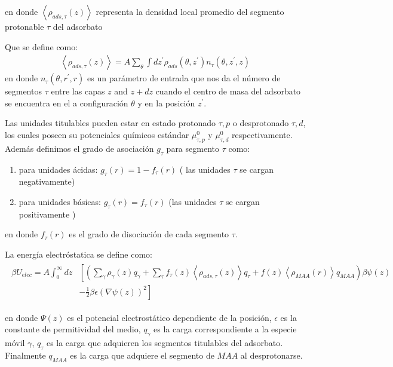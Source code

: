 \noindent en donde $\left<\rho_{ads,\tau}(z)\right>$ representa la densidad local promedio del segmento protonable $\tau$ del adsorbato

Que se define como:
\begin{align}
	\left<\rho_{ads,\tau}(z)\right> = A\sum_\theta \int dz^\prime  \rho_{ads}(\theta,z^\prime)n_\tau(\theta,z^\prime, z)
	\label{eq:film:segments_pro_si}
\end{align}
\noindent en donde $n_\tau(\theta,r^\prime, r)$ es un par\'ametro de entrada que nos da el n\'umero de segmentos $\tau$ entre las capas $z$ and $z+ dz$ cuando el centro de masa del adsorbato se encuentra en el a configuraci\'on $\theta$ y en la posici\'on $z^\prime$.

Las unidades titulables pueden estar en estado protonado $\tau, p$ o desprotonado $\tau, d$, los cuales poseen su potenciales qu\'imicos est\'andar $\mu^0_{\tau,p}$ y $\mu^0_{\tau,d}$ respectivamente. 
Adem\'as definimos el grado de asociaci\'on $g_\tau$ para segmento $\tau$ como:


\begin{enumerate}
	\item para unidades \'acidas: $g_\tau(r) = 1-f_\tau(r)$ ( las unidades $\tau$ se cargan negativamente)
	\item para unidades b\'asicas: $g_\tau(r) = f_\tau(r)$ (las  unidades $\tau$ se cargan positivamente  )
\end{enumerate}
en donde  $f_\tau(r)$ es el grado de disociaci\'on de cada segmento $\tau$.

La energ\'ia electr\'ostatica se define como:
\begin{align}
	\begin{aligned}
		\beta U_{elec}= A\int_0^\infty dz&\left[\left(\sum_{\gamma } {\rho_\gamma(z) q_\gamma + \sum_\tau{f_\tau(z) \left<\rho_{ads,\tau}(z)\right> q_\tau} +  f(z)\left<\rho_{MAA}(r)\right>q_{MAA}}\right)\beta\psi(z) \right. \\ &\left.-\frac{1}{2}\beta\epsilon(\nabla\psi(z))^2 \right]
	\end{aligned}
\end{align} 

\noindent en donde $\Psi(z)$ es el potencial electrost\'atico dependiente de la posici\'on, $\epsilon$ es la constante de permitividad del medio, $q_\gamma$ es la carga correspondiente a la especie m\'ovil $\gamma$, $q_\tau$ es la carga que adquieren los segmentos titulables del adsorbato. Finalmente $q_{MAA}$ es la carga que adquiere el segmento de $MAA$ al desprotonarse.



